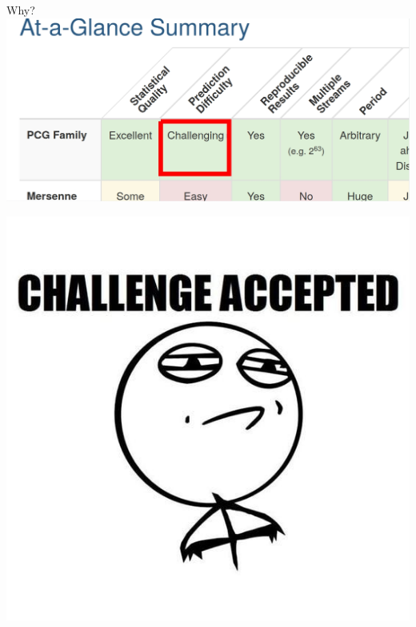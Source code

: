 \begin{frame}{Why?}
    \centering
    \includegraphics[width=0.9\linewidth]{pictures/PCG_challenging.jpg}
\end{frame}

\begin{frame}
    \centering
    \includegraphics[height=\textheight]{pictures/accepted.jpg}
\end{frame}


